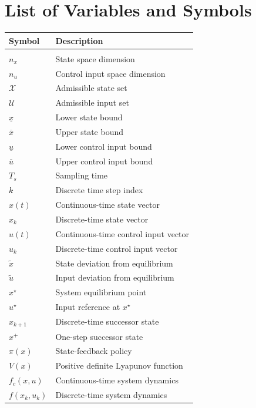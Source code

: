 \chapter*{List of Variables and Symbols}

\begin{longtable}{@{} p{} p{} @{}}
\toprule
\textbf{Symbol} & \textbf{Description} \\
\midrule
\endhead

\bottomrule
\endfoot

\multicolumn{2}{@{}l}{\textit{System Dynamics \& Control}} \\
\midrule
$n_x$ & State space dimension \\
$n_u$ & Control input space dimension \\
$\mathcal{X}$ & Admissible state set \\
$\mathcal{U}$ & Admissible input set \\
$\underline{x}$ & Lower state bound \\
$\overline{x}$ & Upper state bound \\
$\underline{u}$ & Lower control input bound \\
$\overline{u}$ & Upper control input bound \\
$T_s$ & Sampling time \\
$k$ & Discrete time step index \\
$x(t)$ & Continuous-time state vector \\
$x_k$ & Discrete-time state vector \\
$u(t)$ & Continuous-time control input vector \\
$u_k$ & Discrete-time control input vector \\
$\tilde{x}$ & State deviation from equilibrium \\
$\tilde{u}$ & Input deviation from equilibrium \\
$x^\star$ & System equilibrium point \\
$u^\star$ & Input reference at $x^\star$ \\
$x_{k+1}$ & Discrete-time successor state \\
$x^+$ & One-step successor state \\
$\pi(x)$ & State-feedback policy \\
$V(x)$ & Positive definite Lyapunov function \\
$f_c(x, u)$ & Continuous-time system dynamics \\
$f(x_k, u_k)$ & Discrete-time system dynamics \\
\midrule


\end{longtable}
